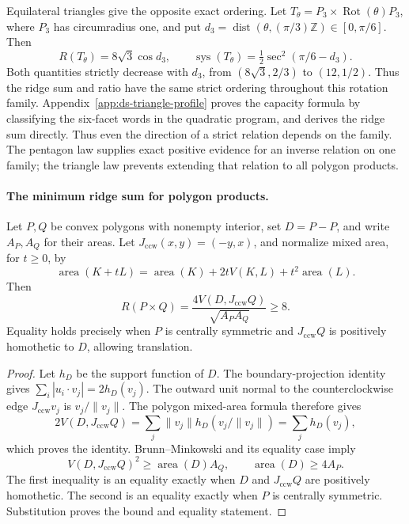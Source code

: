 Equilateral triangles give the opposite exact ordering. Let
$T_\theta=P_3\times\operatorname{Rot}(\theta)P_3$, where $P_3$ has
circumradius one, and put
$d_3=\operatorname{dist}(\theta,(\pi/3)\mathbb Z)\in[0,\pi/6]$. Then
\begin{equation}\label{eq:ds-triangle-profile}
 R(T_\theta)=8\sqrt3\cos d_3,
 \qquad
 \operatorname{sys}(T_\theta)=\tfrac12\sec^2(\pi/6-d_3).
\end{equation}
Both quantities strictly decrease with $d_3$, from $(8\sqrt3,2/3)$ to
$(12,1/2)$. Thus the ridge sum and ratio have the same strict ordering
throughout this rotation family. Appendix~\ref{app:ds-triangle-profile}
proves the capacity formula by classifying the six-facet words in the
quadratic program, and derives the ridge sum directly. Thus even the direction of a strict relation depends on the family.
The pentagon law supplies exact positive evidence for an inverse relation
on one family; the triangle law prevents extending that relation to all
polygon products.

\paragraph{The minimum ridge sum for polygon products.}
Let $P,Q$ be convex polygons with nonempty interior, set $D=P-P$, and write
$A_P,A_Q$ for their areas. Let $J_{\mathrm{ccw}}(x,y)=(-y,x)$, and normalize mixed area, for $t\geq0$, by
\[
 \operatorname{area}(K+tL)=\operatorname{area}(K)+2tV(K,L)
                         +t^2\operatorname{area}(L).
\]
Then
\begin{equation}\label{eq:ds-product-ridge-minimum}
 R(P\times Q)=\frac{4V(D,J_{\mathrm{ccw}}Q)}{\sqrt{A_PA_Q}}\geq8.
\end{equation}
Equality holds precisely when $P$ is centrally symmetric and $J_{\mathrm{ccw}}Q$ is
positively homothetic to $D$, allowing translation.

\begin{proof}
Let $h_D$ be the support function of $D$. The boundary-projection identity
gives $\sum_i|u_i\cdot v_j|=2h_D(v_j)$. The outward unit normal to the
counterclockwise edge $J_{\mathrm{ccw}}v_j$ is $v_j/\|v_j\|$. The polygon mixed-area
formula therefore gives
\[
 2V(D,J_{\mathrm{ccw}}Q)=\sum_j\|v_j\|h_D(v_j/\|v_j\|)
          =\sum_j h_D(v_j),
\]
which proves the identity. Brunn--Minkowski and its equality case
\cite[Sections~3 and~5]{dsGardner2002} imply
\[
 V(D,J_{\mathrm{ccw}}Q)^2\geq\operatorname{area}(D)A_Q,
 \qquad \operatorname{area}(D)\geq4A_P.
\]
The first inequality is an equality exactly when $D$ and $J_{\mathrm{ccw}}Q$ are
positively homothetic. The second is an equality exactly when $P$ is
centrally symmetric. Substitution proves the bound and equality statement.
\end{proof}

